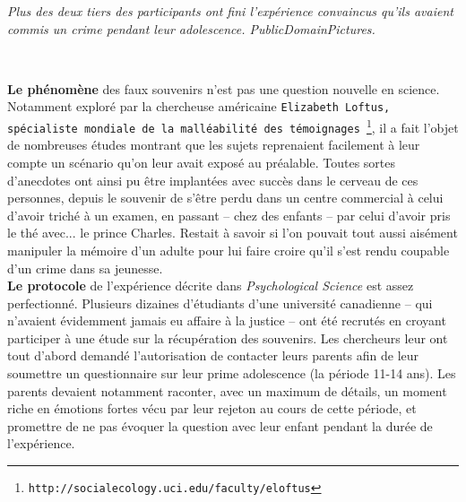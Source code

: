 \documentclass[11pt,twoside,a4paper]{article}
\begin{document}
\begin{minipage}[ht]{7.00cm}
	\emph{\footnotesize Plus des deux tiers des participants ont fini l'exp{\'e}rience convaincus qu'ils avaient commis un crime pendant leur adolescence. \textcopyright PublicDomainPictures.}
\end{minipage} ~\\ %

\textbf{Le ph{\'e}nom{\`e}ne} des faux souvenirs n'est pas une question nouvelle en science. Notamment explor{\'e} par la chercheuse am{\'e}ricaine \texttt{Elizabeth Loftus, sp{\'e}cialiste mondiale de la mall{\'e}abilit{\'e} des t{\'e}moignages~\footnote{\texttt{http://socialecology.uci.edu/faculty/eloftus}}}, il a fait l'objet de nombreuses {\'e}tudes montrant que les sujets reprenaient facilement {\`a} leur compte un sc{\'e}nario qu'on leur avait expos{\'e} au pr{\'e}alable. Toutes sortes d'anecdotes ont ainsi pu {\^e}tre implant{\'e}es avec succ{\`e}s dans le cerveau de ces personnes, depuis le souvenir de s'{\^e}tre perdu dans un centre commercial {\`a} celui d'avoir trich{\'e} {\`a} un examen, en passant -- chez des enfants -- par celui d'avoir pris le th{\'e} avec... le prince Charles. Restait {\`a} savoir si l'on pouvait tout aussi ais{\'e}ment manipuler la m{\'e}moire d'un adulte pour lui faire croire qu'il s'est rendu coupable d'un crime dans sa jeunesse.~\\

\textbf{Le protocole} de l'exp{\'e}rience d{\'e}crite dans \emph{Psychological Science} est assez perfectionn{\'e}. Plusieurs dizaines d'{\'e}tudiants d'une universit{\'e} canadienne -- qui n'avaient {\'e}videmment jamais eu affaire {\`a} la justice -- ont {\'e}t{\'e} recrut{\'e}s en croyant participer {\`a} une {\'e}tude sur la r{\'e}cup{\'e}ration des souvenirs. Les chercheurs leur ont tout d'abord demand{\'e} l'autorisation de contacter leurs parents afin de leur soumettre un questionnaire sur leur prime adolescence (la p{\'e}riode 11-14 ans). Les parents devaient notamment raconter, avec un maximum de d{\'e}tails, un moment riche en {\'e}motions fortes v{\'e}cu par leur rejeton au cours de cette p{\'e}riode, et promettre de ne pas {\'e}voquer la question avec leur enfant pendant la dur{\'e}e de l'exp{\'e}rience.~\\
\end{document}
